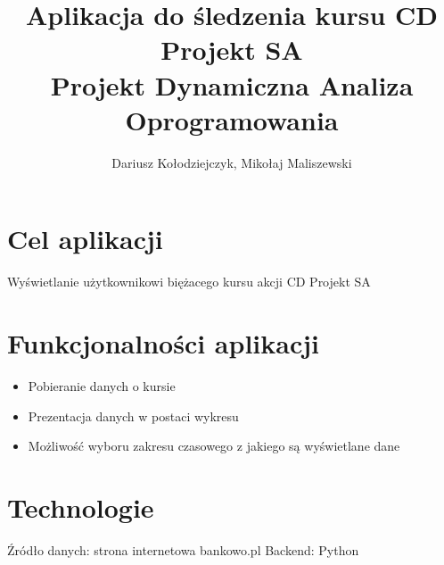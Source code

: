 \documentclass{article}
\begin{document}
		\title{Aplikacja do śledzenia kursu CD Projekt SA \\ Projekt Dynamiczna Analiza Oprogramowania}
	\author{Dariusz Kołodziejczyk, Mikołaj Maliszewski}
	\maketitle
	\section{Cel aplikacji}
	Wyświetlanie użytkownikowi biężacego kursu akcji CD Projekt SA 
	\section{Funkcjonalności aplikacji}
	\begin{itemize}
		\item Pobieranie danych o kursie 
		\item Prezentacja danych w postaci wykresu
		\item Możliwość wyboru zakresu czasowego z jakiego są wyświetlane dane
	\end{itemize}
	\section{Technologie}
	Źródło danych: strona internetowa bankowo.pl
	Backend: Python
	
\end{document}
